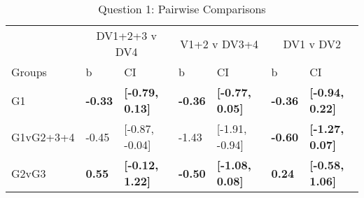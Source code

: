 \documentclass{article}\usepackage[]{graphicx}\usepackage[]{color}
\begin{document}
\begin{table}
\caption{\label{tab:unnamed-chunk-19}Question 1: Pairwise Comparisons}
\centering
\begin{tabular}[t]{lllllll}
\toprule
\multicolumn{1}{c}{ } & \multicolumn{2}{c}{DV1+2+3 v DV4} & \multicolumn{2}{c}{V1+2 v DV3+4} & \multicolumn{2}{c}{DV1 v DV2} \\
\cmidrule(l{2pt}r{2pt}){2-3} \cmidrule(l{2pt}r{2pt}){4-5} \cmidrule(l{2pt}r{2pt}){6-7}
Groups & b & CI & b & CI & b & CI\\
\midrule
G1 & \textbf{-0.33} & \textbf{[-0.79, 0.13]} & \textbf{-0.36} & \textbf{[-0.77, 0.05]} & \textbf{-0.36} & \textbf{[-0.94, 0.22]}\\
G1vG2+3+4 & -0.45 & [-0.87, -0.04] & -1.43 & [-1.91, -0.94] & \textbf{-0.60} & \textbf{[-1.27, 0.07]}\\
G2vG3 & \textbf{0.55} & \textbf{[-0.12, 1.22]} & \textbf{-0.50} & \textbf{[-1.08, 0.08]} & \textbf{0.24} & \textbf{[-0.58, 1.06]}\\
\bottomrule
\end{tabular}
\end{table}
\end{document}
